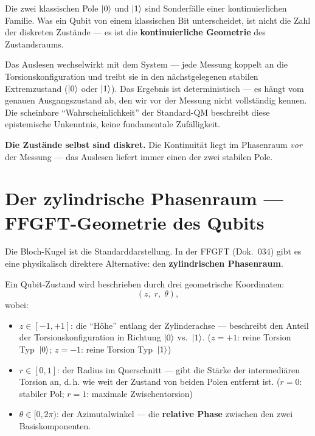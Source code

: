 \begin{keypoint}
Die zwei klassischen Pole $\left|0\right\rangle$ und $\left|1\right\rangle$
sind Sonderfälle einer kontinuierlichen Familie.
Was ein Qubit von einem klassischen Bit unterscheidet,
ist nicht die Zahl der diskreten Zustände ---
es ist die \textbf{kontinuierliche Geometrie} des Zustandsraums.

Das Auslesen wechselwirkt mit dem System --- jede Messung
koppelt an die Torsionskonfiguration und treibt sie
in den nächstgelegenen stabilen Extremzustand ($\left|0\right\rangle$ oder $\left|1\right\rangle$).
Das Ergebnis ist deterministisch --- es hängt vom genauen
Ausgangszustand ab, den wir vor der Messung nicht vollständig kennen.
Die scheinbare ``Wahrscheinlichkeit'' der Standard-QM beschreibt
diese epistemische Unkenntnis, keine fundamentale Zufälligkeit.

\textbf{Die Zustände selbst sind diskret.} Die Kontinuität
liegt im Phasenraum \emph{vor} der Messung ---
das Auslesen liefert immer einen der zwei stabilen Pole.
\end{keypoint}

\section{Der zylindrische Phasenraum --- FFGFT-Geometrie des Qubits}
\label{sec:zylinder}

Die Bloch-Kugel ist die Standarddarstellung.
In der FFGFT (Dok.~034) gibt es eine
physikalisch direktere Alternative:
den \textbf{zylindrischen Phasenraum}.

Ein Qubit-Zustand wird beschrieben durch
drei geometrische Koordinaten:
\begin{equation}
  (z,\; r,\; \theta),
\end{equation}
wobei:
\begin{itemize}
  \item $z \in [-1, +1]$: die ``Höhe'' entlang der
    Zylinder\-achse --- beschreibt den Anteil
    der Torsionskonfiguration in Richtung $\left|0\right\rangle$ vs.\ $\left|1\right\rangle$.
    ($z = +1$: reine Torsion Typ~$\left|0\right\rangle$; $z = -1$: reine Torsion Typ~$\left|1\right\rangle$)
  \item $r \in [0, 1]$: der Radius im Querschnitt ---
    gibt die Stärke der intermediären Torsion an,
    d.\,h. wie weit der Zustand von beiden Polen entfernt ist.
    ($r = 0$: stabiler Pol; $r = 1$: maximale Zwischentorsion)
  \item $\theta \in [0, 2\pi)$: der Azimutalwinkel ---
    die \textbf{relative Phase} zwischen den zwei Basiskomponenten.
\end{itemize}

